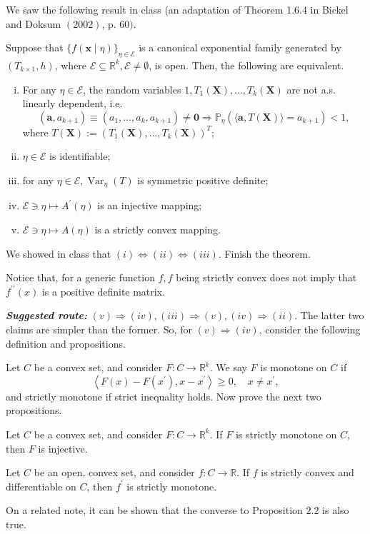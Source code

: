 \begin{exercise}
    We saw the following result in class (an adaptation of Theorem 1.6.4 in Bickel and Doksum \((2002)\), p. 60\()\).
    
     Suppose that \(\{f(\boldsymbol{x} \mid \eta)\}_{\eta \in \mathcal{E}}\) is a canonical exponential family generated by \(\left(T_{k \times 1}, h\right)\), where \(\mathcal{E} \subseteq \mathbb{R}^{k}, \mathcal{E} \neq \emptyset\), is open. Then, the following are equivalent.
    \begin{enumerate}[(i)]
        \item For any \(\eta \in \mathcal{E}\), the random variables \(1, T_{1}(\boldsymbol{X}), \ldots, T_{k}(\boldsymbol{X})\) are not a.s. linearly dependent, i.e.
        \[
            \left(\mathbf{a}, a_{k+1}\right) \equiv\left(a_{1}, \ldots, a_{k}, a_{k+1}\right) \neq \mathbf{0} \Rightarrow \mathbb{P}_{\eta}\left(\langle\mathbf{a}, T(\boldsymbol{X})\rangle=a_{k+1}\right)<1, 
        \]
        where \(T(\boldsymbol{X}):=\left(T_{1}(\boldsymbol{X}), \ldots, T_{k}(\boldsymbol{X})\right)^T\); 
        \item \(\eta \in \mathcal{E}\) is identifiable;
        \item for any \(\eta \in \mathcal{E}, \operatorname{Var}_{\eta}(T)\) is symmetric positive definite;
        \item \(\mathcal{E} \ni \eta \mapsto A^{\prime}(\eta)\) is an injective mapping;
        \item \(\mathcal{E} \ni \eta \mapsto A(\eta)\) is a strictly convex mapping. 
    \end{enumerate}
    We showed in class that \((i) \Leftrightarrow(i i) \Leftrightarrow(i i i)\). Finish the theorem.
    
     Notice that, for a generic function \(f, f\) being strictly convex does not imply that \(f^{\prime \prime}(x)\) is a positive definite matrix.

    \emph{\bfseries Suggested route:} \((v) \Rightarrow(i v),(i i i) \Rightarrow(v),(i v) \Rightarrow(i i)\). The latter two claims are simpler than the former. So, for \((v) \Rightarrow(i v)\), consider the following definition and propositions. 

     Let \(C\) be a convex set, and consider \(F: C \rightarrow \mathbb{R}^{k}\). We say \(F\) is monotone on \(C\) if
    \[
    \left\langle F(x)-F\left(x^{\prime}\right), x-x^{\prime}\right\rangle \geq 0, \quad x \neq x^{\prime},
    \]
    and strictly monotone if strict inequality holds. Now prove the next two propositions. 

     Let \(C\) be a convex set, and consider \(F: C \rightarrow \mathbb{R}^{k}\). If \(F\) is strictly monotone on \(C\), then \(F\) is injective.

     Let \(C\) be an open, convex set, and consider \(f: C \rightarrow \mathbb{R}\). If \(f\) is strictly convex and differentiable on \(C\), then \(f^{\prime}\) is strictly monotone.

    On a related note, it can be shown that the converse to Proposition \(2.2\) is also true.
\end{exercise}


